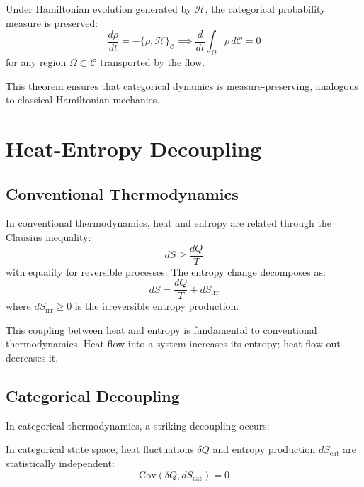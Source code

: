 \begin{theorem}
Under Hamiltonian evolution generated by $\mathcal{H}$, the categorical probability measure is preserved:
\begin{equation}
    \frac{d\rho}{dt} = -\{\rho, \mathcal{H}\}_{\mathcal{C}} \implies \frac{d}{dt}\int_\Omega \rho \, d\mathcal{C} = 0
\end{equation}
for any region $\Omega \subset \mathcal{C}$ transported by the flow.
\end{theorem}

This theorem ensures that categorical dynamics is measure-preserving, analogous to classical Hamiltonian mechanics.

\section{Heat-Entropy Decoupling}
\label{sec:decoupling}

\subsection{Conventional Thermodynamics}

In conventional thermodynamics, heat and entropy are related through the Clausius inequality:
\begin{equation}
    dS \geq \frac{dQ}{T}
\end{equation}
with equality for reversible processes. The entropy change decomposes as:
\begin{equation}
    dS = \frac{dQ}{T} + dS_{\text{irr}}
\end{equation}
where $dS_{\text{irr}} \geq 0$ is the irreversible entropy production.

This coupling between heat and entropy is fundamental to conventional thermodynamics. Heat flow into a system increases its entropy; heat flow out decreases it.

\subsection{Categorical Decoupling}

In categorical thermodynamics, a striking decoupling occurs:

\begin{theorem}
\label{thm:decoupling}
In categorical state space, heat fluctuations $\delta Q$ and entropy production $dS_{\text{cat}}$ are statistically independent:
\begin{equation}
    \text{Cov}(\delta Q, dS_{\text{cat}}) = 0
\end{equation}
\end{theorem}

